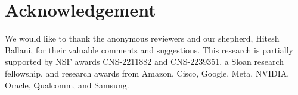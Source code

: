 \section*{Acknowledgement}
We would like to thank the anonymous reviewers and our shepherd, Hitesh Ballani, for their valuable comments and suggestions.
This research is partially supported by NSF awards CNS-2211882 and CNS-2239351, a Sloan research fellowship, and research awards from Amazon, Cisco, Google, Meta, NVIDIA, Oracle, Qualcomm, and Samsung.
